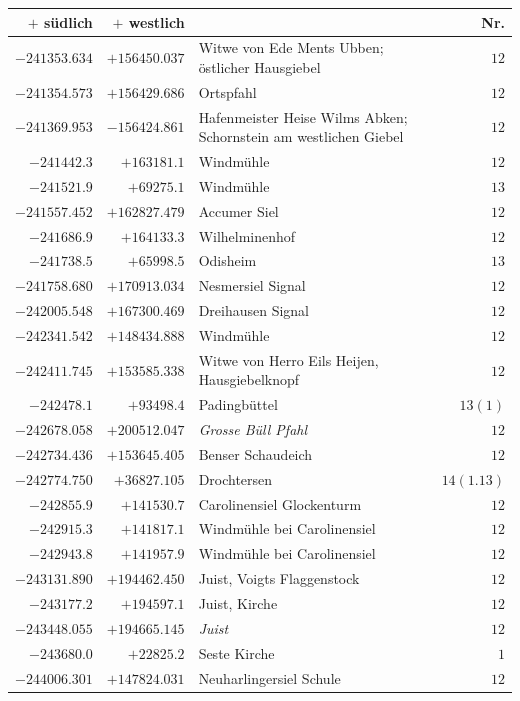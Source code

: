 \begin{center}\begingroup\fontsize{8}{9}\selectfont
\setlength{\tabcolsep}{4pt}
\begin{tabular}{r|r|p{170pt}|r}\hline
\(+\) südlich&\(+\) westlich&&Nr.\\\hline
\(-241353.634\)&\(+156450.037\)&Witwe von Ede Ments Ubben; östlicher Hausgiebel&\(12\)\\
\(-241354.573\)&\(+156429.686\)&Ortspfahl&\(12\)\\
\(-241369.953\)&\(-156424.861\)&Hafenmeister Heise Wilms Abken; Schornstein am westlichen Giebel&\(12\)\\
\(-241442.3\)&\(+163181.1\)&Windmühle&\(12\)\\
\(-241521.9\)&\(+69275.1\)&Windmühle&\(13\)\\
\(-241557.452\)&\(+162827.479\)&Accumer Siel&\(12\)\\
\(-241686.9\)&\(+164133.3\)&Wilhelminenhof&\(12\)\\
\(-241738.5\)&\(+65998.5\)&Odisheim&\(13\)\\
\(-241758.680\)&\(+170913.034\)&Nesmersiel Signal&\(12\)\\
\(-242005.548\)&\(+167300.469\)&Dreihausen Signal&\(12\)\\
\(-242341.542\)&\(+148434.888\)&Windmühle&\(12\)\\
\(-242411.745\)&\(+153585.338\)&Witwe von Herro Eils Heijen, Hausgiebelknopf&\(12\)\\
\(-242478.1\)&\(+93498.4\)&Padingbüttel&\(13(1)\)\\
\(-242678.058\)&\(+200512.047\)&\textit{Grosse Büll Pfahl}&\(12\)\\
\(-242734.436\)&\(+153645.405\)&Benser Schaudeich&\(12\)\\
\(-242774.750\)&\(+36827.105\)&Drochtersen&\(14(1.13)\)\\
\(-242855.9\)&\(+141530.7\)&Carolinensiel Glockenturm&\(12\)\\
\(-242915.3\)&\(+141817.1\)&Windmühle bei Carolinensiel&\(12\)\\
\(-242943.8\)&\(+141957.9\)&Windmühle bei Carolinensiel&\(12\)\\
\(-243131.890\)&\(+194462.450\)&Juist, Voigts Flaggenstock&\(12\)\\
\(-243177.2\)&\(+194597.1\)&Juist, Kirche&\(12\)\\
\(-243448.055\)&\(+194665.145\)&\textit{Juist}&\(12\)\\
\(-243680.0\)&\(+22825.2\)&Seste Kirche&\(1\)\\
\(-244006.301\)&\(+147824.031\)&Neuharlingersiel Schule&\(12\)\\

\end{tabular}
\end{center}
